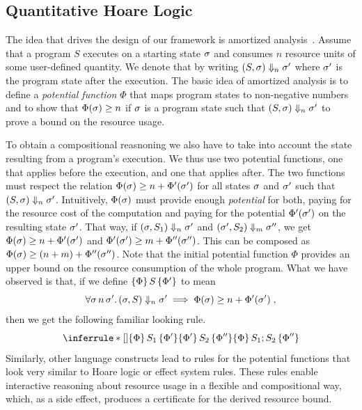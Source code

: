 \documentclass[nocopyrightspace,preprint,pldi]{sigplanconf-pldi15}
\begin{document}
\subsection{Quantitative Hoare Logic}

The idea that drives the design of our framework is amortized
analysis~\cite{Tarjan-amort}.  Assume that a program $S$ executes on a
starting state $\sigma$ and consumes $n$ resource units of some
user-defined quantity.  We denote that by writing $(S, \sigma)
\Downarrow_n \sigma'$ where $\sigma'$ is the program state after the
execution.  The basic idea of amortized analysis is to define a
\emph{potential function} $\Phi$ that maps program states to non-negative
numbers and to show that $\Phi(\sigma) \geq n$ if $\sigma$ is a
program state such that $(S, \sigma) \Downarrow_n \sigma'$ to prove
a bound on the resource usage.

To obtain a compositional reasnoning we also have to take into account
the state resulting from a program's execution.  We thus use two
potential functions, one that applies before the execution, and one
that applies after.  The two functions must respect the relation
$\Phi(\sigma) \ge n + \Phi'(\sigma')$ for all states $\sigma$ and
$\sigma'$ such that $(S, \sigma) \Downarrow_n \sigma'$.  Intuitively,
$\Phi(\sigma)$ must provide enough \emph{potential} for both, paying
for the resource cost of the computation and paying for the potential
$\Phi'(\sigma')$ on the resulting state $\sigma'$. That way, if
$(\sigma, S_1) \Downarrow_n \sigma'$ and $(\sigma', S_2) \Downarrow_m
\sigma''$, we get $\Phi(\sigma) \ge n + \Phi'(\sigma')$ and
$\Phi'(\sigma') \ge m + \Phi''(\sigma'')$.  This can be composed as
$\Phi(\sigma) \ge (n + m) + \Phi''(\sigma'')$.  Note that the initial
potential function $\Phi$ provides an upper bound on the resource
consumption of the whole program.  What we have observed is that, if
we define $\{\Phi\}\, S\, \{\Phi'\}$ to mean
$$
\forall \sigma\, n\, \sigma'.\, (\sigma, S) \Downarrow_n \sigma' \implies \Phi(\sigma) \ge
n + \Phi'(\sigma') \; ,
$$
then we get the following familiar looking rule.
$$
\RuleNolabel
{\htriple{\Phi}{S_1}{\Phi'} \\ \htriple{\Phi'}{S_2}{\Phi''}}
{\htriple{\Phi} {S_1; S_2}  {\Phi''}}
$$
%
Similarly, other language constructs lead to rules for the potential
functions that look very similar to Hoare logic or effect system
rules.  These rules enable interactive reasoning about resource usage
in a flexible and compositional way, which, as a side effect, produces
a certificate for the derived resource bound.
\end{document}
